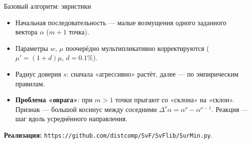 \documentclass[10pt,aspectratio=169]{beamer}
\newcommand{\EQ}{{=}}
\begin{document}
\begin{frame}{Базовый алгоритм: эвристики}
  \begin{itemize}
    \item Начальная последовательность --- малые возмущения одного
      заданного вектора $\alpha$ ($m+1$ точка).
    \item Параметры $w$, $\mu$ поочерёдно мультипликативно корректируются
      ($\mu'=(1+d)\mu$, $d\EQ 0.1\%$).
    \item Радиус доверия $s$: сначала «агрессивно» растёт,
      далее --- по эмпирическим правилам.
    \item \textbf{Проблема «оврага»}: при $m>1$ точки прыгают со «склона»
      на «склон». Признак --- большой косинус между соседними
      $\Delta^\nu\alpha=\alpha^\nu-\alpha^{\nu-1}$.
      Реакция --- шаг вдоль усреднённого направления.
  \end{itemize}
  \vspace{0.5em}

   \textbf{Реализация:} \texttt{https://github.com/distcomp/SvF/SvFlib/SurMin.py}.
\end{frame}
\end{document}
